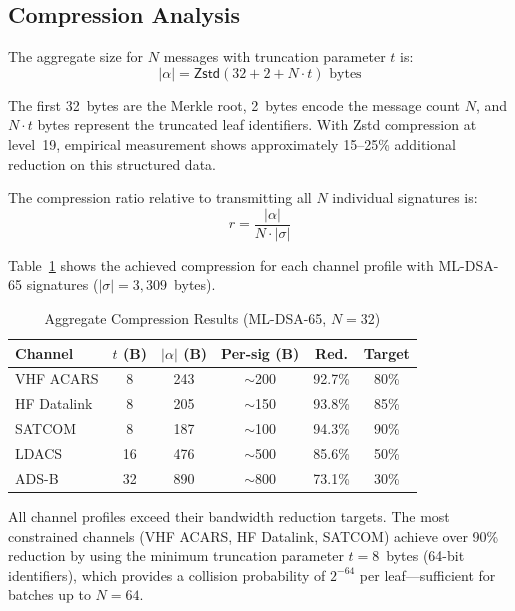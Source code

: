 \documentclass[conference,10pt]{IEEEtran}
\begin{document}
\subsection{Compression Analysis}

The aggregate size for $N$ messages with truncation parameter $t$ is:
\begin{equation}
    |\alpha| = \mathsf{Zstd}\left(32 + 2 + N \cdot t\right) \text{ bytes}
\label{eq:agg_size}
\end{equation}

The first 32~bytes are the Merkle root, 2~bytes encode the message count $N$, and $N \cdot t$ bytes represent the truncated leaf identifiers. With Zstd compression at level~19, empirical measurement shows approximately 15--25\% additional reduction on this structured data.

The compression ratio relative to transmitting all $N$ individual signatures is:
\begin{equation}
    r = \frac{|\alpha|}{N \cdot |\sigma|}
\end{equation}

Table~\ref{tab:compression_results} shows the achieved compression for each channel profile with ML-DSA-65 signatures ($|\sigma| = 3{,}309$~bytes).

\begin{table}[t]
\centering
\caption{Aggregate Compression Results (ML-DSA-65, $N=32$)}
\label{tab:compression_results}
\begin{tabular}{lccccc}
\toprule
\textbf{Channel} & $t$ \textbf{(B)} & $|\alpha|$ \textbf{(B)} & \textbf{Per-sig (B)} & \textbf{Red.} & \textbf{Target} \\
\midrule
VHF ACARS & 8 & 243 & $\sim$200 & 92.7\% & 80\% \\
HF Datalink & 8 & 205 & $\sim$150 & 93.8\% & 85\% \\
SATCOM & 8 & 187 & $\sim$100 & 94.3\% & 90\% \\
LDACS & 16 & 476 & $\sim$500 & 85.6\% & 50\% \\
ADS-B & 32 & 890 & $\sim$800 & 73.1\% & 30\% \\
\bottomrule
\end{tabular}
\end{table}

All channel profiles exceed their bandwidth reduction targets. The most constrained channels (VHF ACARS, HF Datalink, SATCOM) achieve over 90\% reduction by using the minimum truncation parameter $t=8$~bytes (64-bit identifiers), which provides a collision probability of $2^{-64}$ per leaf---sufficient for batches up to $N=64$.
\end{document}
